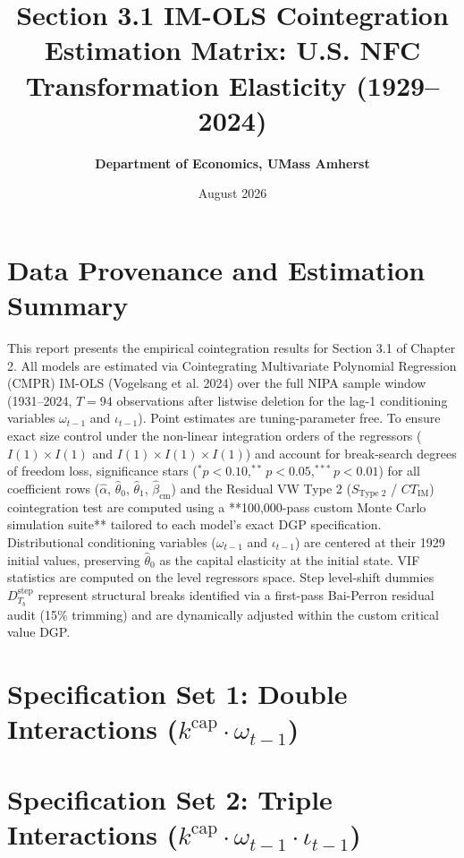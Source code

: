 \documentclass[11pt,a4paper]{article}
\title{\textbf{Section 3.1 IM-OLS Cointegration Estimation Matrix: U.S. NFC Transformation Elasticity (1929--2024)}}
\author{\textbf{Department of Economics, UMass Amherst}}
\date{August 2026}
\begin{document}
\maketitle

\section*{Data Provenance and Estimation Summary}
This report presents the empirical cointegration results for Section 3.1 of Chapter 2. All models are estimated via Cointegrating Multivariate Polynomial Regression (CMPR) IM-OLS (Vogelsang et al. 2024) over the full NIPA sample window (1931--2024, $T=94$ observations after listwise deletion for the lag-1 conditioning variables $\omega_{t-1}$ and $\iota_{t-1}$). Point estimates are tuning-parameter free. To ensure exact size control under the non-linear integration orders of the regressors ($I(1) \times I(1)$ and $I(1) \times I(1) \times I(1)$) and account for break-search degrees of freedom loss, significance stars ($^*p<0.10, ^{**}p<0.05, ^{***}p<0.01$) for all coefficient rows ($\hat{\alpha}$, $\hat{\theta}_0$, $\hat{\theta}_1$, $\hat{\beta}_{\text{cm}}$) and the Residual VW Type 2 ($S_{\text{Type 2}}$ / $CT_{\text{IM}}$) cointegration test are computed using a **100,000-pass custom Monte Carlo simulation suite** tailored to each model's exact DGP specification. Distributional conditioning variables ($\omega_{t-1}$ and $\iota_{t-1}$) are centered at their 1929 initial values, preserving $\hat{\theta}_0$ as the capital elasticity at the initial state. VIF statistics are computed on the level regressors space. Step level-shift dummies $D^{\text{step}}_{T_b}$ represent structural breaks identified via a first-pass Bai-Perron residual audit (15\% trimming) and are dynamically adjusted within the custom critical value DGP.

\FloatBarrier
\section{Specification Set 1: Double Interactions ($k^{\text{cap}} \cdot \omega_{t-1}$)}
\FloatBarrier


\FloatBarrier


\FloatBarrier
\section{Specification Set 2: Triple Interactions ($k^{\text{cap}} \cdot \omega_{t-1} \cdot \iota_{t-1}$)}
\FloatBarrier


\FloatBarrier

\end{document}

